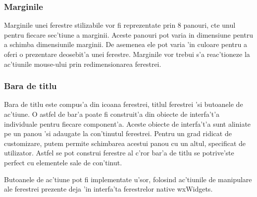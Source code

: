 \subsubsection{Marginile}

Marginile unei ferestre stilizabile vor fi reprezentate prin 8 panouri, c{\ia}te unul pentru fiecare sec'tiune a marginii. Aceste panouri pot varia in dimensiune pentru a schimba dimensiunile marginii. De asemenea ele pot varia 'in culoare pentru a oferi o prezentare deosebit'a unei ferestre. Marginile vor trebui s'a reac'tioneze la ac'tiunile mouse-ului prin redimensionarea ferestrei.

\subsubsection{Bara de  titlu}

Bara de titlu este compus'a din icoana ferestrei, titlul ferestrei 'si butoanele de ac'tiune. O astfel de bar'a poate fi construit'a din obiecte de interfa't'a individuale pentru fiecare component'a. Aceste obiecte de interfa't'a sunt aliniate pe un panou 'si adaugate la con'tinutul ferestrei. Pentru un grad ridicat de customizare, putem permite schimbarea acestui panou cu un altul, specificat de utilizator. Astfel se pot construi ferestre al c'ror bar'a de titlu se potrive'ste perfect cu elementele sale de con'tinut.

Butoanele de ac'tiune pot fi implementate u'sor, folosind ac'tiunile de manipulare ale ferestrei prezente deja 'in interfa'ta ferestrelor native wxWidgets.

